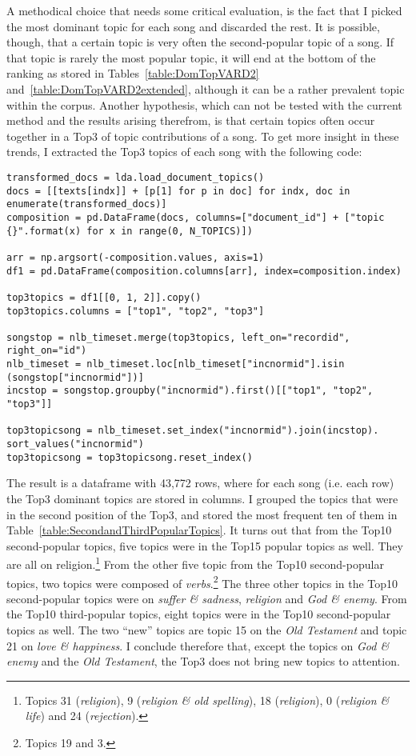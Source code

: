 A methodical choice that needs some critical evaluation, is the fact that I picked the most dominant topic for each song and discarded the rest. It is possible, though, that a certain topic is very often the second-popular topic of a song. If that topic is rarely the most popular topic, it will end at the bottom of the ranking as stored in Tables~\ref{table:DomTopVARD2} and~\ref{table:DomTopVARD2extended}, although it can be a rather prevalent topic within the corpus. Another hypothesis, which can not be tested with the current method and the results arising therefrom, is that certain topics often occur together in a Top3 of topic contributions of a song. To get more insight in these trends, I extracted the Top3 topics of each song with the following code:

\begin{lstlisting}
transformed_docs = lda.load_document_topics()
docs = [[texts[indx]] + [p[1] for p in doc] for indx, doc in enumerate(transformed_docs)]
composition = pd.DataFrame(docs, columns=["document_id"] + ["topic {}".format(x) for x in range(0, N_TOPICS)])

arr = np.argsort(-composition.values, axis=1)
df1 = pd.DataFrame(composition.columns[arr], index=composition.index)

top3topics = df1[[0, 1, 2]].copy()
top3topics.columns = ["top1", "top2", "top3"]

songstop = nlb_timeset.merge(top3topics, left_on="recordid", right_on="id")
nlb_timeset = nlb_timeset.loc[nlb_timeset["incnormid"].isin
(songstop["incnormid"])]
incstop = songstop.groupby("incnormid").first()[["top1", "top2", "top3"]]

top3topicsong = nlb_timeset.set_index("incnormid").join(incstop).
sort_values("incnormid")
top3topicsong = top3topicsong.reset_index()
\end{lstlisting}

\noindent The result is a dataframe with 43,772 rows, where for each song (i.e. each row) the Top3 dominant topics are stored in columns. I grouped the topics that were in the second position of the Top3, and stored the most frequent ten of them in Table~\ref{table:SecondandThirdPopularTopics}. It turns out that from the Top10 second-popular topics, five topics were in the Top15 popular topics as well. They are all on religion.\footnote{Topics 31 (\textit{religion}), 9 (\textit{religion \& old spelling}), 18 (\textit{religion}), 0 (\textit{religion \& life}) and 24 (\textit{rejection}).} From the other five topic from the Top10 second-popular topics, two topics were composed of \textit{verbs}.\footnote{Topics 19 and 3.} The three other topics in the Top10 second-popular topics were on \textit{suffer \& sadness}, \textit{religion} and \textit{God \& enemy}. From the Top10 third-popular topics, eight topics were in the Top10 second-popular topics as well. The two \enquote{new} topics are topic 15 on the \textit{Old Testament} and topic 21 on \textit{love \& happiness}. I conclude therefore that, except the topics on \textit{God \& enemy} and the \textit{Old Testament}, the Top3 does not bring new topics to attention.

